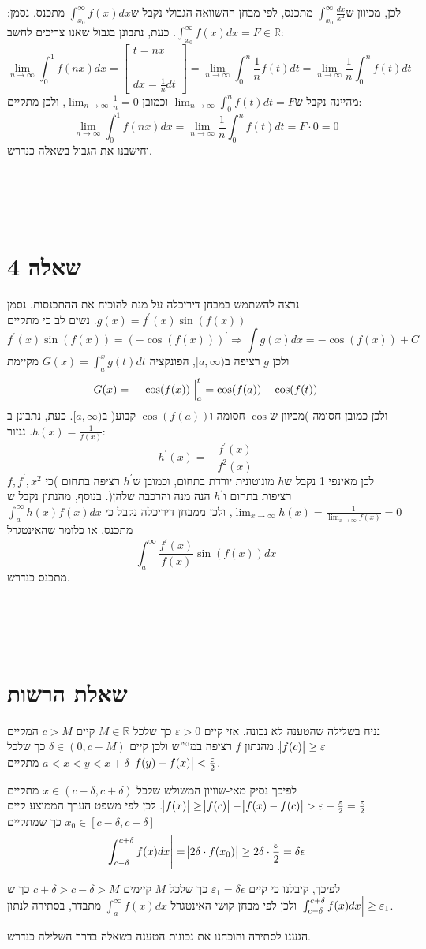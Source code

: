 \documentclass[11pt, oneside]{article}
\newcommand{\qed}{\R{$\blacksquare$}}
\newcommand{\br}{\\\\\\\\\\}
\newcommand{\logr}[1]{\underset{\text{#1}}{\Longrightarrow}}
\newcommand{\mR}{\mathbb{R}}
\newcommand{\defi}[3]{\int_{#1}^{#2} #3}
\newcommand{\evi}[3]{\eval[2]{\;#1\;}_{#2}^{#3}}
\newcommand{\sub}[2]{\begin{bmatrix} #1\br #2\end{bmatrix}}
\begin{document}
לכן, מכיוון ש$\defi{x_{0}}{\infty}{\frac{dx}{x^{2}}}$ מתכנס, לפי מבחן ההשוואה הגבולי נקבל ש$\defi{x_{0}}{\infty}{f(x)dx}$ מתכנס. נסמן: $\defi{x_{0}}{\infty}{f(x)dx} = F \in \mR$. כעת, נתבונן בגבול שאנו צריכים לחשב:
\[
\lim_{n \to \infty} \defi{0}{1}{f(nx)dx}
= \sub{t = nx}{dx = \frac{1}{n}dt}
= \lim_{n \to \infty} \defi{0}{n}{\frac{1}{n}f(t)dt}
= \lim_{n \to \infty} \frac{1}{n}\defi{0}{n}{f(t)dt}
\]
מהיינה נקבל ש$\lim_{n \to \infty} \defi{0}{n}{f(t)dt} = F$ וכמובן $\lim_{n \to \infty} \frac{1}{n} = 0$, ולכן מתקיים:
\[
\lim_{n \to \infty} \defi{0}{1}{f(nx)dx}
= \lim_{n \to \infty} \frac{1}{n}\defi{0}{n}{f(t)dt}
= F \cdot 0 = 0
\]
וחישבנו את הגבול בשאלה כנדרש.
\br\qed

\section*{שאלה 4}
נרצה להשתמש במבחן דיריכלה על מנת להוכיח את ההתכנסות. נסמן $g(x) = f^{\prime}(x)\sin({f(x)})$. נשים לב כי מתקיים
\[
f^{\prime}(x)\sin({f(x)}) = \left(-\cos(f(x))\right)^{\prime} \logr{} \int g(x)dx = -\cos(f(x)) + C
\]
ולכן $g$ רציפה ב$[a, \infty)$, הפונקציה $G(x) = \defi{a}{x}{g(t)dt}$ מקיימת
\[
G(x) = \evi{-\cos(f(x))}{a}{t} = \cos(f(a)) - \cos(f(t))
\]
ולכן כמובן חסומה )מכיוון ש$\cos$ חסומה ו$\cos(f(a))$ קבוע( ב$[a, \infty)$. כעת, נתבונן ב$h(x) = \frac{1}{f(x)}$. נגזור:
\[
h^{\prime}(x) = -\frac{f^{\prime}(x)}{f^{2}(x)}
\]
לכן מאינפי 1 נקבל ש$h$ מונוטונית יורדת בתחום, וכמובן ש$h^{\prime}$ רציפה בתחום )כי $f, f^{\prime}, x^{2}$ רציפות בתחום ו$h^{\prime}$ הנה מנה והרכבה שלהן(. בנוסף, מהנתון נקבל ש$\lim_{x \to \infty} h(x) = \frac{1}{\lim_{x \to \infty} f(x)} = 0$, ולכן ממבחן דיריכלה נקבל כי $\defi{a}{\infty}{h(x)f(x)dx}$ מתכנס, או כלומר שהאינטגרל
\[
\defi{a}{\infty}{\frac{f^{\prime}(x)}{f(x)}\sin(f(x))dx}
\]
מתכנס כנדרש.
\br\qed
\clearpage

\section*{שאלת הרשות}
נניח בשלילה שהטענה לא נכונה. אזי קיים $\varepsilon > 0$ כך שלכל $M \in \mR$ קיים $c > M$ המקיים $\abs{f(c)} \ge \varepsilon$. מהנתון $f$ רציפה במ``''ש ולכן קיים $\delta \in (0, c - M)$ כך שלכל $a < x < y < x + \delta$ מתקיים $\abs{f(y) - f(x)} < \frac{\varepsilon}{2}$.

לפיכך נסיק מאי-שוויון המשולש שלכל $x \in (c - \delta, c + \delta)$ מתקיים $\abs{f(x)} \ge \abs{f(c)} - \abs{f(x) - f(c)} > \varepsilon - \frac{\varepsilon}{2} = \frac{\varepsilon}{2}$. לכן לפי משפט הערך הממוצע קיים $x_{0} \in [c - \delta, c + \delta]$ כך שמתקיים
\[
\abs{\defi{c - \delta}{c + \delta}{f(x)dx}} = \abs{2\delta \cdot f(x_{0})} \ge 2\delta \cdot \frac{\varepsilon}{2} = \delta\epsilon
\]

לפיכך, קיבלנו כי קיים $\varepsilon_{1} = \delta\epsilon$ כך שלכל $M$ קיימים $c + \delta > c - \delta > M$ כך ש$\abs{\defi{c - \delta}{c + \delta}{f(x)dx}} \ge \varepsilon_{1}$ ולכן לפי מבחן קושי האינטגרל $\defi{a}{\infty}{f(x)dx}$ מתבדר, בסתירה לנתון.

הגענו לסתירה והוכחנו את נכונות הטענה בשאלה בדרך השלילה כנדרש.
\br\qed
\end{document}
